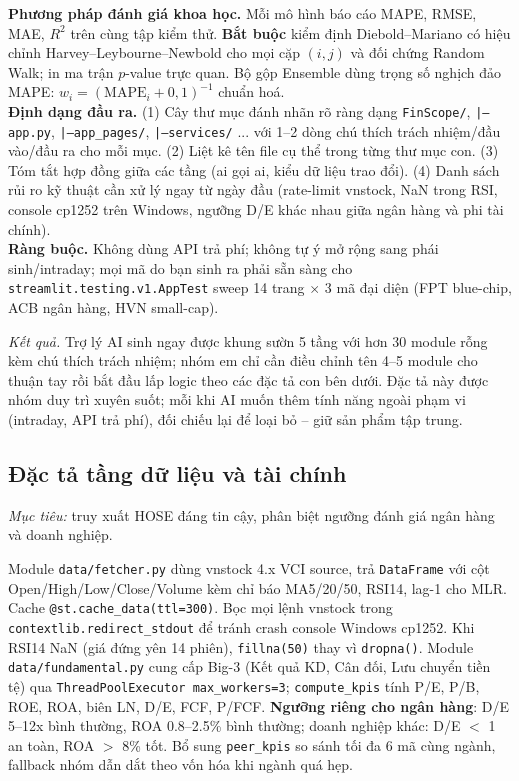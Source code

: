 \documentclass[12pt,a4paper]{article}
\begin{document}
\begin{promptbox}
\textbf{Phương pháp đánh giá khoa học.} Mỗi mô hình báo cáo MAPE, RMSE, MAE, $R^2$ trên cùng tập kiểm thử. \textbf{Bắt buộc} kiểm định Diebold--Mariano có hiệu chỉnh Harvey--Leybourne--Newbold cho mọi cặp $(i,j)$ và đối chứng Random Walk; in ma trận $p$-value trực quan. Bộ gộp Ensemble dùng trọng số nghịch đảo MAPE: $w_i = (\mathrm{MAPE}_i + 0{,}1)^{-1}$ chuẩn hoá.\\[2pt]
\textbf{Định dạng đầu ra.} (1) Cây thư mục đánh nhãn rõ ràng dạng \texttt{FinScope/}, \texttt{|--app.py}, \texttt{|--app\_pages/}, \texttt{|--services/} ... với 1--2 dòng chú thích trách nhiệm/đầu vào/đầu ra cho mỗi mục. (2) Liệt kê tên file cụ thể trong từng thư mục con. (3) Tóm tắt hợp đồng giữa các tầng (ai gọi ai, kiểu dữ liệu trao đổi). (4) Danh sách rủi ro kỹ thuật cần xử lý ngay từ ngày đầu (rate-limit vnstock, NaN trong RSI, console cp1252 trên Windows, ngưỡng D/E khác nhau giữa ngân hàng và phi tài chính).\\[2pt]
\textbf{Ràng buộc.} Không dùng API trả phí; không tự ý mở rộng sang phái sinh/intraday; mọi mã do bạn sinh ra phải sẵn sàng cho \texttt{streamlit.testing.v1.AppTest} sweep 14 trang $\times$ 3 mã đại diện (FPT blue-chip, ACB ngân hàng, HVN small-cap).
\end{promptbox}

\textit{Kết quả.} Trợ lý AI sinh ngay được khung sườn 5 tầng với hơn 30 module rỗng kèm chú thích trách nhiệm; nhóm em chỉ cần điều chỉnh tên 4--5 module cho thuận tay rồi bắt đầu lấp logic theo các đặc tả con bên dưới. Đặc tả này được nhóm duy trì xuyên suốt; mỗi khi AI muốn thêm tính năng ngoài phạm vi (intraday, API trả phí), đối chiếu lại để loại bỏ -- giữ sản phẩm tập trung.

\subsection{Đặc tả tầng dữ liệu và tài chính}

\textit{Mục tiêu:} truy xuất HOSE đáng tin cậy, phân biệt ngưỡng đánh giá ngân hàng và doanh nghiệp.

\begin{promptbox}
\footnotesize Module \texttt{data/fetcher.py} dùng vnstock 4.x VCI source, trả \texttt{DataFrame} với cột Open/High/Low/Close/Volume kèm chỉ báo MA5/20/50, RSI14, lag-1 cho MLR. Cache \texttt{@st.cache\_data(ttl=300)}. Bọc mọi lệnh vnstock trong \texttt{contextlib.redirect\_stdout} để tránh crash console Windows cp1252. Khi RSI14 NaN (giá đứng yên 14 phiên), \texttt{fillna(50)} thay vì \texttt{dropna()}. Module \texttt{data/fundamental.py} cung cấp Big-3 (Kết quả KD, Cân đối, Lưu chuyển tiền tệ) qua \texttt{ThreadPoolExecutor max\_workers=3}; \texttt{compute\_kpis} tính P/E, P/B, ROE, ROA, biên LN, D/E, FCF, P/FCF. \textbf{Ngưỡng riêng cho ngân hàng}: D/E 5--12x bình thường, ROA 0.8--2.5\% bình thường; doanh nghiệp khác: D/E $<$ 1 an toàn, ROA $>$ 8\% tốt. Bổ sung \texttt{peer\_kpis} so sánh tối đa 6 mã cùng ngành, fallback nhóm dẫn dắt theo vốn hóa khi ngành quá hẹp.
\end{promptbox}
\end{document}

